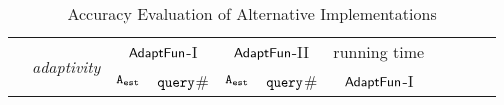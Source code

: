 {\scriptsize
\begin {table}[t]
    \caption{Accuracy Evaluation of {\THESYSTEM}  Alternative Implementations}
        \label{tb:adapt-imp-alternatives}
        \begin{center}
        \centering
{\scriptsize
        \begin{tabular}{ | >{\tiny}l | c | c | c | c | c | c | c | c | c  |c}
        \hline \hline
        \multirow{2}{*}{Program $c$}
        &\multirow{2}{*}{\emph{adaptivity}}
         & \multicolumn{2}{c|}{$\textsf{AdaptFun}$-I}
         & \multicolumn{2}{c|}{$\textsf{AdaptFun}$-II}
         & {running time} \\ 
         \cline{3-9}
        & & {${\mathtt{A_{est}}}$ } & {${\tt query}$\# } & {${\mathtt{A_{est}}}$ } & {${\tt query}$\# }  & $\textsf{AdaptFun}$-I \\
         \cline{8-9}
         \hline \hline

\end{tabular}}
\end{center}
\end{table}}
